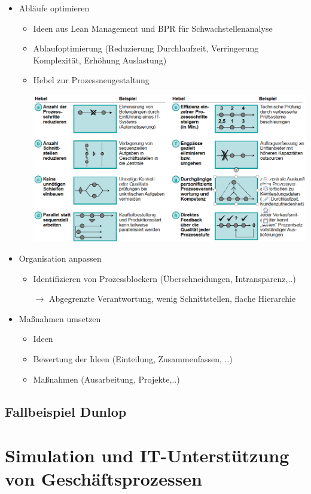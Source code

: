 \documentclass[11pt,a4paper]{article}
\begin{document}
\begin{itemize}
\item Abläufe optimieren
	\begin{itemize}
	\item Ideen aus Lean Management und BPR für Schwachstellenanalyse
	\item Ablaufoptimierung (Reduzierung Durchlaufzeit, Verringerung Komplexität, Erhöhung Auslastung)
	\item Hebel zur Prozessneugestaltung
	\item[] \includegraphics[width=15cm]{hebel}
	\end{itemize}

\item Organisation anpassen
	\begin{itemize}
	\item Identifizieren von Prozessblockern (Überschneidungen, Intransparenz,..)
	\item[$\rightarrow$] Abgegrenzte Verantwortung, wenig Schnittstellen, flache Hierarchie
	\end{itemize}
	
\item Maßnahmen umsetzen
	\begin{itemize}
	\item Ideen 
	\item Bewertung der Ideen (Einteilung, Zusammenfassen, ..)
	\item Maßnahmen (Ausarbeitung, Projekte,..)
	\end{itemize}
\end{itemize}

\subsection{Fallbeispiel Dunlop}

\section{Simulation und IT-Unterstützung von Geschäftsprozessen}
\end{document}
